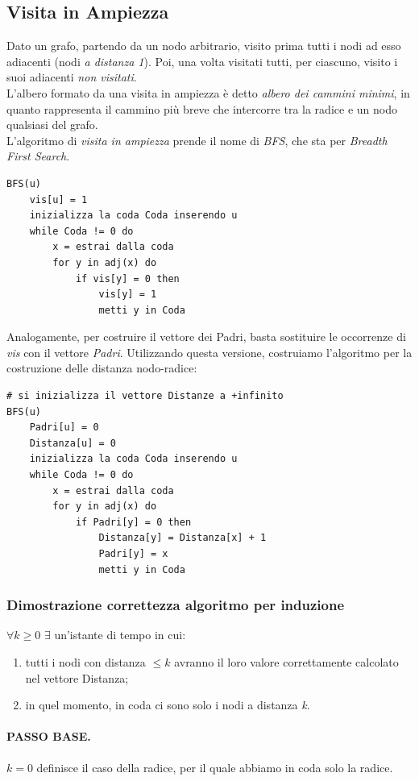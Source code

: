 \subsection{Visita in Ampiezza}
Dato un grafo, partendo da un nodo arbitrario, visito prima tutti i nodi ad esso adiacenti (nodi \textit{a distanza 1}). Poi, una volta visitati tutti, per ciascuno, visito i suoi adiacenti \textit{non visitati}. \\
L'albero formato da una visita in ampiezza è detto \textit{albero dei cammini minimi}, in quanto rappresenta il cammino più breve che intercorre tra la radice e un nodo qualsiasi del grafo. \\
L'algoritmo di \textit{visita in ampiezza} prende il nome di \textit{BFS}, che sta per \textit{Breadth First Search}.
\begin{lstlisting}
BFS(u)
	vis[u] = 1
    inizializza la coda Coda inserendo u
    while Coda != 0 do
        x = estrai dalla coda
        for y in adj(x) do
            if vis[y] = 0 then
                vis[y] = 1
                metti y in Coda
\end{lstlisting}
Analogamente, per costruire il vettore dei Padri, basta sostituire le occorrenze di \textit{vis} con il vettore \textit{Padri}. Utilizzando questa versione, costruiamo l'algoritmo per la costruzione delle distanza nodo-radice:
\begin{lstlisting}
# si inizializza il vettore Distanze a +infinito
BFS(u)
    Padri[u] = 0
    Distanza[u] = 0
    inizializza la coda Coda inserendo u
    while Coda != 0 do
        x = estrai dalla coda
        for y in adj(x) do
            if Padri[y] = 0 then
                Distanza[y] = Distanza[x] + 1
                Padri[y] = x
                metti y in Coda
\end{lstlisting}
\subsubsection{Dimostrazione correttezza algoritmo per induzione}
$\forall k \geq 0$ $\exists$ un'istante di tempo in cui:
\begin{enumerate}
    \item tutti i nodi con distanza $\leq k$ avranno il loro valore correttamente calcolato nel vettore Distanza;
    \item in quel momento, in coda ci sono solo i nodi a distanza \textit{k}.
\end{enumerate}
\paragraph{PASSO BASE.}
$k=0$ definisce il caso della radice, per il quale abbiamo in coda solo la radice.
